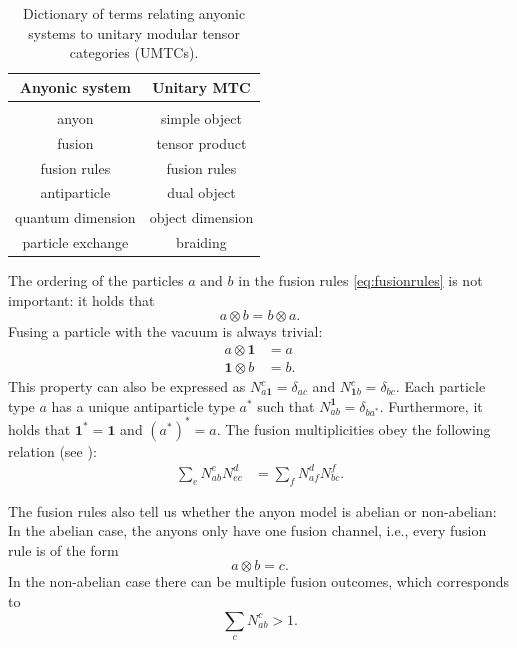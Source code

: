 \begin{table}[t]
	\begin{tabular}{c|c}
		Anyonic system & Unitary MTC\\ \hline\\[-8pt]
		anyon & simple object\\
		fusion & tensor product\\
		fusion rules & fusion rules\\
		antiparticle & dual object\\
		quantum dimension & object dimension\\
		particle exchange & braiding
		\vspace{10pt}
	\end{tabular}
	\caption{\small \label{tab:MTCanyons}Dictionary of terms relating anyonic systems to unitary modular tensor categories (UMTCs).}
\end{table}

The ordering of the particles $a$ and $b$ in the fusion rules \cref{eq:fusionrules} is not important: it holds that
	\begin{equation}
		a\otimes b=b\otimes a.
	\end{equation}	
Fusing a particle with the vacuum is always trivial:
	\begin{align}
		a\otimes\mathbf{1}&=a\\
		\mathbf{1}\otimes b&=b.
	\end{align}
This property can also be expressed as $N_{a\mathbf{1}}^c=\delta_{ac}$ and $N_{\mathbf{1}b}^c=\delta_{bc}$. Each particle type $a$ has a unique antiparticle type $a^*$ such that $N_{ab}^\mathbf{1}=\delta_{ba^*}$. Furthermore, it holds that $\mathbf{1}^*=\mathbf{1}$ and $\left(a^*\right)^*=a$. The fusion multiplicities obey the following relation (see \cite{Bond2007}):
	\begin{align}
		\sum_e N_{ab}^e N_{ec}^d&=\sum_f N_{af}^d N_{bc}^f.
	\end{align}

The fusion rules also tell us whether the anyon model is abelian or non-abelian: In the abelian case, the anyons only have one fusion channel, i.e., every fusion rule is of the form 
	\begin{equation}
	\label{eq:abelian}
		a\otimes b=c.
	\end{equation}
In the non-abelian case there can be multiple fusion outcomes, which corresponds to
	\begin{equation}
	\label{eq:nonabelian}
		\sum_c N_{ab}^c>1.
	\end{equation}

